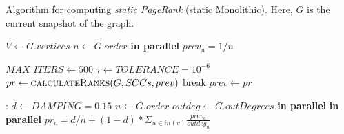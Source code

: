 \vspace{2em}
\begin{algorithm}[!hbtp]
\caption{Algorithm for computing \emph{static PageRank} (static Monolithic). Here, $G$ is the current snapshot of the graph.}
\label{alg:pr-static}
\begin{algorithmic}
\State $V \gets G.vertices$
\State $n \gets G.order$
 \textbf{in parallel}
  \State $prev_u = 1/n$
\EndFor
{}
\EndFunction

\Statex

  \State $MAX\_ITERS \gets 500$
  \State $\tau \gets TOLERANCE = 10^{-6}$
    \State $pr \gets \textsc{calculateRanks}(G, SCCs, prev)$
        \State $\textrm{break}$
    \EndIf
    \State $prev \gets pr$
  \EndFor
\EndFunction

\Statex

:
  \State $d \gets DAMPING = 0.15$
  \State $n \gets G.order$
  \State $outdeg \gets G.outDegrees$
   \textbf{in parallel}
     \textbf{in parallel}
      \State $pr_v = d/n + (1 - d) * \Sigma _{u \in in(v)} \frac{prev_u}{outdeg_u}$
    \EndFor
  \EndFor
\EndFunction
\end{algorithmic}
\end{algorithm}
\vspace{1em}
